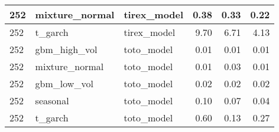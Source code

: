 {\begin{tabular}{lllrrr}
\midrule
252 & mixture\_normal & tirex\_model & 0.38 & 0.33 & 0.22 \\
\midrule
252 & t\_garch & tirex\_model & 9.70 & 6.71 & 4.13 \\
\midrule
252 & gbm\_high\_vol & toto\_model & 0.01 & 0.01 & 0.01 \\
\midrule
252 & mixture\_normal & toto\_model & 0.01 & 0.03 & 0.01 \\
\midrule
252 & gbm\_low\_vol & toto\_model & 0.02 & 0.02 & 0.02 \\
\midrule
252 & seasonal & toto\_model & 0.10 & 0.07 & 0.04 \\
\midrule
252 & t\_garch & toto\_model & 0.60 & 0.13 & 0.27 \\
\bottomrule
\end{tabular}
}
